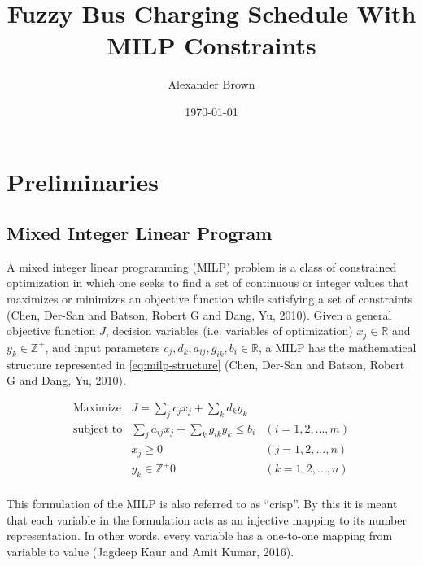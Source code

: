 \documentclass[11pt,a4paper,final]{article}
\author{Alexander Brown}
\date{\today}
\title{Fuzzy Bus Charging Schedule With MILP Constraints}
\begin{document}
\maketitle
\tableofcontents

\let\ref\autoref                            %

\section{Preliminaries}
\label{sec:orgf93db56}
\subsection{Mixed Integer Linear Program}
\label{sec:orgeec5c14}
A mixed integer linear programming (MILP) problem is a class of constrained optimization in which one seeks to find a
set of continuous or integer values that maximizes or minimizes an objective function while satisfying a set of
constraints (Chen, Der-San and Batson, Robert G and Dang, Yu, 2010). Given a general objective function \(J\), decision variables (i.e. variables of
optimization) \(x_j \in \mathbb{R}\) and \(y_k \in \mathbb{Z}^+\), and input parameters \(c_j, d_k, a_{ij}, g_{ik}, b_i \in \mathbb{R}\), a MILP has the
mathematical structure represented in \ref{eq:milp-structure} (Chen, Der-San and Batson, Robert G and Dang, Yu, 2010).

\begin{equation}
\label{eq:milp-structure}
\begin{array}{lll}
\text{Maximize}   & J = \sum_j c_j x_j + \sum_k d_k y_k            &                 \\
\text{subject to} & \sum_j a_{ij} x_j + \sum_k g_{ik} y_k  \le b_i & (i = 1,2,...,m) \\
                  & x_j \ge 0                                      & (j = 1,2,...,n) \\
                  & y_k \in \mathbb{Z^+}0                          & (k = 1,2,...,n) \\
\end{array}
\end{equation}

This formulation of the MILP is also referred to as ``crisp''. By this it is meant that each variable in the formulation
acts as an injective mapping to its number representation. In other words, every variable has a one-to-one mapping from
variable to value (Jagdeep Kaur and Amit Kumar, 2016).
\end{document}
